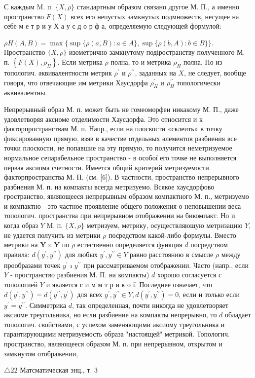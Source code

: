 \documentclass[10pt]{article}
\begin{document}
С каждым M. п. $\{X, \rho\}$ стандартным образом связано другое М. П., а именно пространство $F(X)$ всех его непустых замкнутых подмножеств, несущее на себе м е т р и у Х а у с д о р ф а, определяемую следующей формулой:



$\rho H(A, B)=\max \{\sup \{\rho(a, B): a \in A\}, \sup \{\rho(b, A): b \in B\}\}$. Пространство $\{X, \rho\}$ изометрично замкнутому подіространству полученного М. п. $\left\{F(X), \rho_{H}\right\}$. Если метрика $\rho$ полна, то и метрика $\rho_{H}$ полна. Но из топологич. әквивалентности метрик $\rho^{\prime}$ и $\rho^{\prime \prime}$, заданных на $X$, не следует, вообще говоря, что отвечающие им метрики Хаусдорфа $\rho_{H}^{\prime}$ и $\rho_{H}^{\prime \prime}$ топологически әквивалентны.



Непрерывный образ М. п. может быть не гомеоморфен никакому М. П., даже удовлетворяя аксиоме отделимости Хаусдорфа. Это относится и к факторпространствам М. п. Напр., если на плоскости «склеить» в точку фиксированную прямую, взяв в качестве отдельных әлементов разбиения все точки плоскости, не попавшие на эту прямую, то получится неметризуемое нормальное сепарабельное пространство - в особої его точке не выполняется первая аксиома счетности. Имеется общий критерий метризуемости факторпространства М. П. (см. [6]). В частности, пространство непрерывного разбиения М. п. на компакты всегда метризуемо. Всякое хаусдорфово гространство, являющееся непрерывным образом компактного М. п., метризуемо и компактно - это частное проявление общего положения о неповышении веса топологич. пространства при непрерывном отображении на бикомпакт. Но и когда образ $Y$ M. п. $\{X, \rho\}$ метризуем, метрику, осуществляющую метризацию $Y$, не удается получить из метрики $\rho$ посредством какой-либо формулы. Вместо метрики на $\boldsymbol{Y} \times \boldsymbol{Y}$ по $\rho$ естественно определяется функция $d$ посредством правила: $d\left(y^{\prime}, y^{\prime \prime}\right)$ для любых $y^{\prime}, y^{\prime \prime} \in Y$ равно расстоянию в смысле $\rho$ между прообразами точек $y^{\prime}$ ı $y^{\prime \prime}$ при рассматриваемом отображении. Часто (напр., если $Y$ - пространство разбиения М. П. на компакты) $d$ хорошо согласуется с топологией $Y$ и является с и м м т р и к о і̆. Последнее означает, что $d\left(y^{\prime}, y^{\prime \prime}\right)=d\left(y^{\prime \prime}, y^{\prime}\right)$ для всех $y^{\prime}, y^{\prime \prime} \in Y, d\left(y^{\prime}, y^{\prime \prime}\right)=0$, если и только если $y^{\prime}=y^{\prime \prime}$. Симметрика $d$, так определенная, почти никогда не удовлетворяет аксиоме треугольника, но если разбиение на компакты непрерывно, то $d$ обладает топологич. свойствами, с успехом заменяющими аксиому треугольника и гарантирующими метризуемость образа "настоящей" метрикой. Топологич. пространство, являющееся образом М. п. при непрерывном, открытом и замкнутом отображении,



$\triangle 22$ Матсматическая энц., т. 3
\end{document}
